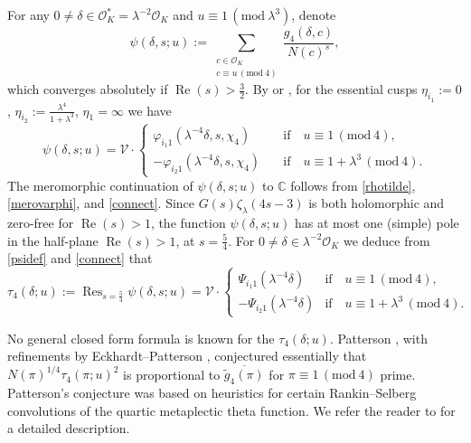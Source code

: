 \documentclass[12pt,reqno]{amsart}
\numberwithin{equation}{section}
\renewcommand{\Re}{\operatorname{Re}}
\renewcommand{\pmod}[1]{\, (\mathrm{mod}\ #1)}
\DeclareMathOperator*{\Res}{Res}
\begin{document}
For any $0 \neq \delta \in \mathcal{O}_K^* = \lambda^{-2} \mathcal{O}_K$ and $u \equiv 1 \pmod{\lambda^3}$, denote 
\begin{equation*}
    \psi(\delta,s;u) := \sum_{\substack{c \in \mathcal{O}_K \\ c \equiv u \pmod{4}}}  \frac{g_4(\delta, c)}{N(c)^s},
\end{equation*}
which converges absolutely if $\Re(s)>\frac{3}{2}$. By \cite[(2.37)]{Dia} or \cite[Proposition 2]{Suz1}, for the essential cusps $\eta_{i_1} := 0$, $\eta_{i_2} := \frac{\lambda^4}{1+\lambda^3}$, $\eta_1=\infty$ we have
\begin{equation} \label{connect}
    \psi(\delta, s; u)= \mathcal{V} \cdot
    \begin{cases}
        \varphi_{i_1 1}(\lambda^{-4} \delta,s,\chi_4) & \quad \text{if} \quad u \equiv 1 \pmod{4}, \\
        - \varphi_{i_2 1}(\lambda^{-4} \delta,s,\chi_4) & \quad  \text{if} \quad u \equiv 1+\lambda^3 \pmod{4}. 
    \end{cases}
\end{equation}
The meromorphic continuation of $\psi(\delta,s;u)$ to $\mathbb{C}$ follows from \eqref{rhotilde}, \cref{merovarphi}, and \eqref{connect}. Since $G(s) \zeta_{\lambda}(4s-3)$ is both holomorphic and zero-free for $\Re(s)>1$, the function $\psi(\delta, s;u)$ has at most one (simple) pole in the half-plane $\Re(s)>1$, at $s=\frac{5}{4}$. For $0\neq \delta \in \lambda^{-2}\mathcal{O}_K$ we deduce from \eqref{psidef} and \eqref{connect} that 
\begin{equation} \label{resD}
    \tau_4(\delta;u):=\Res_{s=\frac{5}{4}} \psi(\delta,s;u)= \mathcal{V} \cdot
    \begin{cases}
        \Psi_{i_1 1}(\lambda^{-4} \delta) & \text{if} \quad u \equiv 1 \pmod{4}, \\
        -\Psi_{i_2 1}(\lambda^{-4} \delta) & \text{if} \quad u \equiv 1+\lambda^3 \pmod{4}.
    \end{cases}
\end{equation}

No general closed form formula is known for the $\tau_4(\delta;u)$. Patterson \cite{Pat2}, with refinements by Eckhardt--Patterson \cite[Conjecture~2.11]{EckPat}, conjectured essentially that $N(\pi)^{1/4} \tau_4(\pi;u)^2$ is proportional to $\overline{\widetilde{g}_4(\pi)}$ for $\pi \equiv 1 \pmod{4}$ prime. 
Patterson's conjecture was based on heuristics for certain Rankin--Selberg convolutions of the quartic metaplectic theta function.
We refer the reader to \cite{BH} for a detailed description. 
\end{document}
